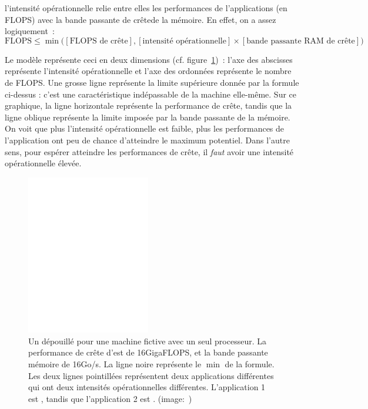 l'intensité opérationnelle relie entre elles les performances de l'applications
(en FLOPS) avec la bande passante \og de crête\fg de la mémoire. En effet,
on a assez logiquement~:
\[
  \text{FLOPS} \leq \min \bigl([\text{FLOPS de crête}], [\text{intensité opérationnelle}] \times [\text{bande passante RAM de crête}] \bigr)
\]


Le modèle  représente ceci en deux dimensions
(cf. figure~\ref{fig:roofline-basic})~: l'axe des abscisses représente
l'intensité opérationnelle et l'axe des ordonnées représente le nombre de
FLOPS. Une grosse ligne représente la limite supérieure donnée par la formule
ci-dessus : c'est une caractéristique indépassable de la machine elle-même.
Sur ce graphique, la ligne horizontale représente la performance de crête,
tandis que la ligne oblique représente la limite imposée par la bande passante
de la mémoire. On voit que plus l'intensité opérationnelle est faible, plus les
performances de l'application ont peu de chance d'atteindre le maximum
potentiel. Dans l'autre sens, pour espérer atteindre les performances de crête,
il \emph{faut} avoir une intensité opérationnelle élevée.

\begin{figure}
  \centering
  \includegraphics[height=7cm]{roofline_basic.pdf}
  \caption{Un  dépouillé pour une machine fictive avec un seul
    processeur. La performance de crête d'est de 16GigaFLOPS, et la bande
    passante mémoire de 16Go/s. La ligne noire représente le $\min$ de la
    formule.  Les deux lignes pointillées représentent deux applications
    différentes qui ont deux intensités opérationnelles différentes.
    L'application 1 est , tandis que l'application 2 est
    .  (image:~\cite{WilliamsWP09})\label{fig:roofline-basic}}
\end{figure}

